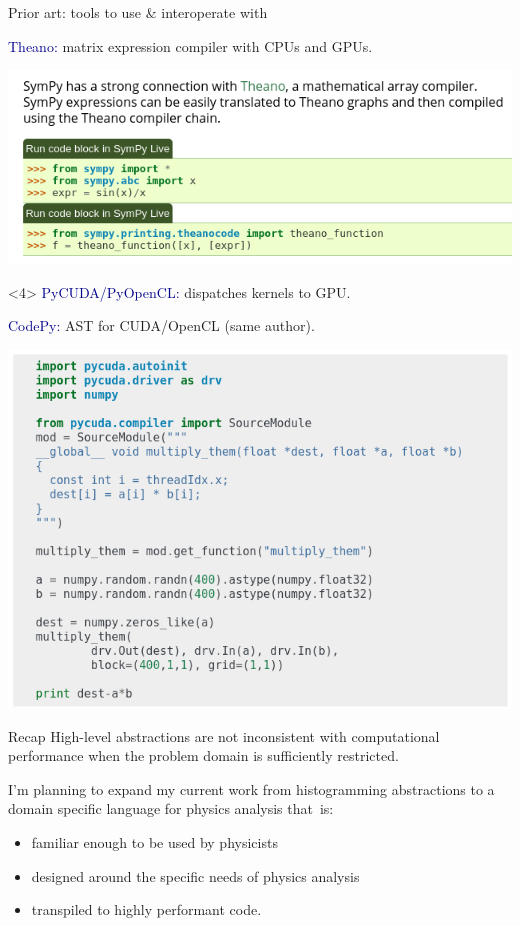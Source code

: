 \documentclass{beamer}
\begin{document}
\begin{frame}{Prior art: tools to use \& interoperate with}
\begin{onlyenv}
\vspace{0.2 cm}
\textcolor{darkblue}{\Large Theano:} matrix expression compiler with CPUs and GPUs.

\vspace{0.2 cm}
\includegraphics[width=\linewidth]{sympy_theano.png}
\end{onlyenv}

\begin{onlyenv}<4>
\vspace{0.5 cm}
\textcolor{darkblue}{\Large PyCUDA/PyOpenCL:} dispatches kernels to GPU.

\vspace{0.2 cm}
\textcolor{darkblue}{\Large CodePy:} AST for CUDA/OpenCL (same author).

\begin{center}
\includegraphics[width=0.8\linewidth]{pycuda_pyopencl_codepy.png}
\end{center}
\end{onlyenv}
\end{frame}

\begin{frame}{Recap}
High-level abstractions are not inconsistent with computational performance when the problem domain is sufficiently restricted.

\vfill
I'm planning to expand my current work from histogramming abstractions to a domain specific language for physics analysis \mbox{that is:}
\begin{itemize}
\item familiar enough to be used by physicists
\item designed around the specific needs of physics analysis
\item transpiled to highly performant code.
\end{itemize}
\end{frame}
\end{document}
